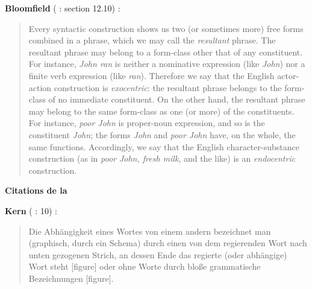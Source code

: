 {    \textbf{Bloomfield} (\citeyear{bloomfield1933language} : section 12.10) :

    \begin{quote}

    Every syntactic construction shows us two (or sometimes more) free forms combined in a phrase, which we may call the \textit{resultant} phrase. The resultant phrase may belong to a form-class other that of any constituent. For instance, \textit{John ran} is neither a nominative expression (like \textit{John}) nor a finite verb expression (like \textit{ran}). Therefore we say that the English actor-action construction is \textit{exocentric}: the resultant phrase belongs to the form-class of no immediate constituent. On the other hand, the resultant phrase may belong to the same form-class as one (or more) of the constituents. For instance, \textit{poor John} is proper-noun expression, and so is the constituent \textit{John}; the forms \textit{John} and \textit{poor John} have, on the whole, the same functions. Accordingly, we say that the English character-substance construction (as in \textit{poor John, fresh milk}, and the like) is an \textit{endocentric} construction.
    \end{quote}

    {\bfseries
    Citations de la 
    }

    \textbf{Kern} (\citealt{kern1883zur} : 10) :

    \begin{quote}

    Die Abhängigkeit eines Wortes von einem andern bezeichnet man (graphisch, durch ein Schema) durch einen von dem regierenden Wort nach unten gezogenen Strich, an dessen Ende das regierte (oder abhängige) Wort steht [figure] oder ohne Worte durch bloße grammatische Bezeichnungen [figure].
    \end{quote}
}
